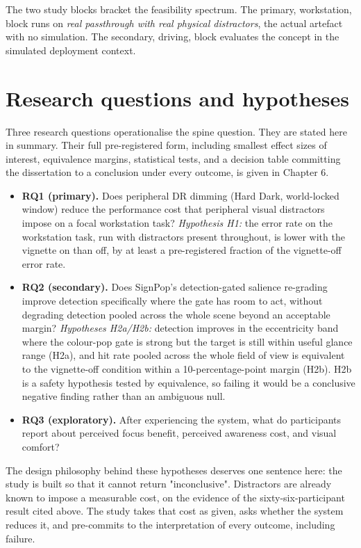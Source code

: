 The two study blocks bracket the feasibility spectrum. The primary, workstation, block runs on
\textit{real passthrough with real physical distractors}, the actual artefact with no simulation. The
secondary, driving, block evaluates the concept in the simulated deployment context.

\section{Research questions and hypotheses}

Three research questions operationalise the spine question. They are stated here in summary. Their
full pre-registered form, including smallest effect sizes of interest, equivalence margins,
statistical tests, and a decision table committing the dissertation to a conclusion under every
outcome, is given in Chapter 6.

\begin{itemize}
\item \textbf{RQ1 (primary).} Does peripheral DR dimming (Hard Dark, world-locked window) reduce the
  performance cost that peripheral visual distractors impose on a focal workstation task?
  \textit{Hypothesis H1:} the error rate on the workstation task, run with distractors present
  throughout, is lower with the vignette on than off, by at least a pre-registered fraction of the
  vignette-off error rate.
\item \textbf{RQ2 (secondary).} Does SignPop's detection-gated salience re-grading improve detection
  specifically where the gate has room to act, without degrading detection pooled across the whole
  scene beyond an acceptable margin?
  \textit{Hypotheses H2a/H2b:} detection improves in the eccentricity band where the colour-pop gate is
  strong but the target is still within useful glance range (H2a), and hit rate pooled across the
  whole field of view is equivalent to the vignette-off condition within a 10-percentage-point margin
  (H2b). H2b is a safety hypothesis tested by equivalence, so failing it would be a conclusive
  negative finding rather than an ambiguous null.
\item \textbf{RQ3 (exploratory).} After experiencing the system, what do participants report about
  perceived focus benefit, perceived awareness cost, and visual comfort?
\end{itemize}

The design philosophy behind these hypotheses deserves one sentence here: the study is built so that
it cannot return "inconclusive". Distractors are already known to impose a measurable cost, on the
evidence of the sixty-six-participant result cited above. The study takes that cost as given, asks
whether the system reduces it, and pre-commits to the interpretation of every outcome, including
failure.

